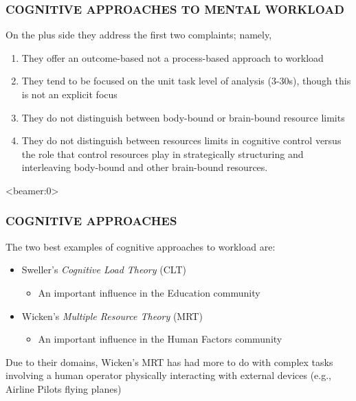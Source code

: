 \documentclass{beamer}
\begin{document}
\begin{frame}
	\frametitle{COGNITIVE APPROACHES TO MENTAL WORKLOAD}
On the plus side they address the first two complaints; namely,
	\begin{enumerate}
		\item They offer an outcome-based not a process-based approach to workload
		\item They tend to be focused on the unit task level of analysis (3-30s), though this is not an explicit focus
	\pause
		\item They do not distinguish between body-bound or brain-bound resource limits
		\item They do not distinguish between resources limits in cognitive control versus the role that control resources play in strategically structuring and interleaving body-bound and other brain-bound resources.
	\end{enumerate}
	\vspace{.7cm}

\end{frame}

\begin{frame}<beamer:0>
	\frametitle{COGNITIVE APPROACHES}
	The two best examples of cognitive approaches to workload are:
	\begin{itemize}
		\item Sweller's \emph{Cognitive Load Theory} (CLT) \parencite{chandler96acp,leahy03,leahy11,vanmerri05,sweller88}
		\begin{itemize}
			\item An important influence in the Education community
		\end{itemize}
		\pause
	\listpart{\&}
		\item Wicken's \emph{Multiple Resource Theory} (MRT) \parencite{wickens81,wickens92book,wickens02}
		\begin{itemize}
			\item An important influence in the Human Factors community
		\end{itemize}
	\end{itemize}
\pause
Due to their domains, Wicken's MRT has had more to do with complex tasks involving a human operator physically interacting with external devices (e.g., Airline Pilots flying planes)

\end{frame}
\end{document}

